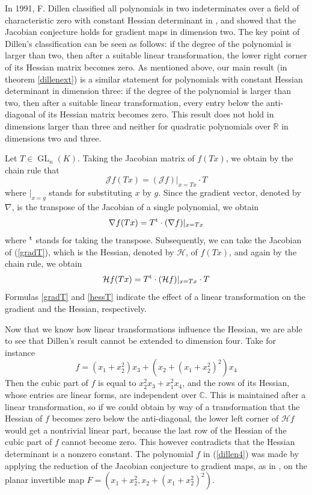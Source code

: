 \documentclass[10pt]{article}
\theoremstyle{remark}
\theoremstyle{definition}
\newcommand{\jac}{{\mathcal J}}
\newcommand{\hess}{{\mathcal H}}
\newcommand{\grad}{\nabla}
\newcommand{\GL}{\operatorname{GL}}
\newcommand{\C}{{\mathbb C}}
\newcommand{\R}{{\mathbb R}}
\newcommand{\tp}{^{\rm t}}
\begin{document}
In 1991, F. Dillen classified all polynomials in two indeterminates over a field of characteristic
zero with constant Hessian determinant in \cite{MR1107649}, and showed that the Jacobian conjecture
holds for gradient maps in dimension two. The key point of Dillen's classification can be seen
as follows: if the degree of the polynomial is larger than two, then after a suitable linear transformation, 
the lower right corner of its Hessian matrix becomes zero.
As mentioned above, our main result (in theorem \ref{dillenext}) is a similar statement for polynomials
with constant Hessian determinant in dimension three:
if the degree of the polynomial is larger than two, then after a suitable linear transformation, 
every entry below the anti-diagonal of its Hessian matrix becomes zero. 
This result does not hold in dimensions larger than three and neither for quadratic polynomials over 
$\R$ in dimensions two and three.

Let $T \in \GL_n(K)$. Taking the Jacobian matrix of $f(Tx)$, we obtain by the chain rule that
$$
\jac f(Tx) = (\jac f)|_{x=Tx} \cdot T
$$
where $|_{x=g}$ stands for substituting $x$ by $g$.
Since the gradient vector, denoted by $\grad$, is the transpose of the Jacobian of a single 
polynomial, we obtain
\begin{equation} \label{gradT}
\grad f(Tx) = T\tp \cdot (\grad f)|_{x=Tx}
\end{equation}
where $\tp$ stands for taking the transpose.
Subsequently, we can take the Jacobian of (\ref{gradT}), which is the Hessian, denoted by $\hess$,
of $f(Tx)$, and again by the chain rule, we obtain
\begin{equation} \label{hessT}
\hess f(Tx) = T\tp \cdot (\hess f)|_{x=Tx} \cdot T
\end{equation}
Formulas \ref{gradT} and \ref{hessT} indicate the effect of a linear transformation 
on the gradient and the Hessian, respectively.

Now that we know how linear transformations influence the Hessian, we are able to see that Dillen's result 
cannot be extended to dimension four. Take for instance 
\begin{equation} \label{dillen4}
f = (x_1 + x_2^2) x_3 + (x_2 + (x_1 + x_2^2)^2) x_4
\end{equation}
Then the cubic part of $f$ is equal to $x_2^2 x_3 + x_1^2 x_4$, and the rows of its Hessian, whose
entries are linear forms, are independent over $\C$. This is maintained after a linear transformation, 
so if we could obtain by way of a transformation that
the Hessian of $f$ becomes zero below the anti-diagonal, the lower left corner of $\hess f$ would 
get a nontrivial linear part, because the last row of the Hessian of the cubic part of 
$f$ cannot become zero. This however contradicts that the Hessian determinant is a 
nonzero constant. The polynomial $f$ in (\ref{dillen4}) was made by applying the reduction
of the Jacobian conjecture to gradient maps, as in \cite[Prop.\@ 1.4]{MR2221506}, on the planar 
invertible map $F = (x_1 + x_2^2, x_2 + (x_1 + x_2^2)^2)$.
\end{document}
